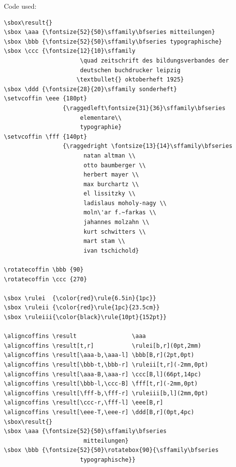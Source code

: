 \documentclass{article}
\begin{document}
\newpage

\typesetcoffin \result

\newpage

\vspace*{3cm}
\begin{center}
  {\Large Code used: \par}
\vspace*{1cm}


\begin{minipage}{14cm}
\begin{verbatim}
\sbox\result{}
\sbox \aaa {\fontsize{52}{50}\sffamily\bfseries mitteilungen}
\sbox \bbb {\fontsize{52}{50}\sffamily\bfseries typographische}
\sbox \ccc {\fontsize{12}{10}\sffamily 
                      \quad zeitschrift des bildungsverbandes der
                      deutschen buchdrucker leipzig 
                     \textbullet{} oktoberheft 1925}
\sbox \ddd {\fontsize{28}{20}\sffamily sonderheft}
\setvcoffin \eee {180pt}
                 {\raggedleft\fontsize{31}{36}\sffamily\bfseries 
                      elementare\\
                      typographie}
\setvcoffin \fff {140pt}
                 {\raggedright \fontsize{13}{14}\sffamily\bfseries 
                       natan altman \\
                       otto baumberger \\
                       herbert mayer \\
                       max burchartz \\
                       el lissitzky \\
                       ladislaus moholy-nagy \\
                       moln\'ar f.~farkas \\
                       jahannes molzahn \\
                       kurt schwitters \\
                       mart stam \\
                       ivan tschichold}
     
\rotatecoffin \bbb {90}
\rotatecoffin \ccc {270}

\sbox \rulei  {\color{red}\rule{6.5in}{1pc}}
\sbox \ruleii {\color{red}\rule{1pc}{23.5cm}}
\sbox \ruleiii{\color{black}\rule{10pt}{152pt}}

\aligncoffins \result                \aaa
\aligncoffins \result[t,r]           \rulei[b,r](0pt,2mm)
\aligncoffins \result[\aaa-b,\aaa-l] \bbb[B,r](2pt,0pt)
\aligncoffins \result[\bbb-t,\bbb-r] \ruleii[t,r](-2mm,0pt)
\aligncoffins \result[\aaa-B,\aaa-r] \ccc[B,l](66pt,14pc)
\aligncoffins \result[\bbb-l,\ccc-B] \fff[t,r](-2mm,0pt)
\aligncoffins \result[\fff-b,\fff-r] \ruleiii[b,l](2mm,0pt)
\aligncoffins \result[\ccc-r,\fff-l] \eee[B,r]
\aligncoffins \result[\eee-T,\eee-r] \ddd[B,r](0pt,4pc)
\sbox\result{}
\sbox \aaa {\fontsize{52}{50}\sffamily\bfseries
                       mitteilungen}
\sbox \bbb {\fontsize{52}{50}\rotatebox{90}{\sffamily\bfseries 
                      typographische}}


\end{verbatim}
\end{minipage}
\end{center}
\end{document}
